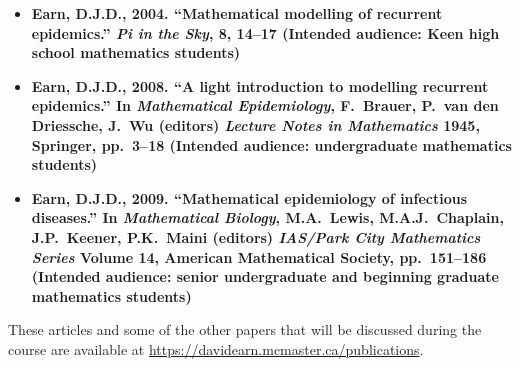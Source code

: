 \documentclass[12pt]{article}
\begin{document}
\def\me{\bf Earn, D.J.D.\rm}
\def\vol#1{{\bf#1}}
\def\pp#1{{#1}}
\begin{itemize}

\item {}\me, 2004. ``Mathematical modelling of recurrent epidemics.'' 
{\it Pi in the Sky\/}, \vol{8}, 14--17\qquad
(Intended audience: Keen high school mathematics students)

\item{}\me, 2008. ``A light introduction to modelling recurrent epidemics.'' In {\it Mathematical Epidemiology\/}, F.\ Brauer, P.\ van den Driessche, J.\ Wu (editors) {\it Lecture Notes in Mathematics\/} \vol{1945}, Springer, pp.\ 3--18\qquad
(Intended audience: undergraduate mathematics students)

\item{}\me, 2009.  ``Mathematical epidemiology of infectious diseases.'' In {\it Mathematical Biology\/}, M.A.\ Lewis, M.A.J.\ Chaplain, J.P.\ Keener, P.K.\ Maini (editors) {\it IAS/Park City Mathematics Series\/} Volume {\bf 14}, American Mathematical Society, pp.\ 151--186\qquad
(Intended audience: senior undergraduate and beginning graduate mathematics students)

\end{itemize}

\noindent
These articles and some of the other papers that will be discussed during the course are available at \url{https://davidearn.mcmaster.ca/publications}.
\end{document}
